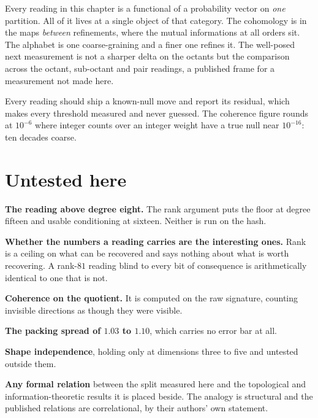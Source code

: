 Every reading in this chapter is a functional of a probability vector on \emph{one} partition. All of it lives at a single object of that category. The cohomology is in the maps \emph{between} refinements, where the mutual informations at all orders sit. The alphabet is one coarse-graining and a finer one refines it. The well-posed next measurement is not a sharper delta on the octants but the comparison across the octant, sub-octant and pair readings, a published frame for a measurement not made here.

Every reading should ship a known-null move and report its residual, which makes every threshold measured and never guessed. The coherence figure rounds at \(10^{-6}\) where integer counts over an integer weight have a true null near \(10^{-16}\): ten decades coarse.

\section{Untested here}

\textbf{The reading above degree eight.} The rank argument puts the floor at degree fifteen and usable conditioning at sixteen. Neither is run on the hash.

\textbf{Whether the numbers a reading carries are the interesting ones.} Rank is a ceiling on what can be recovered and says nothing about what is worth recovering. A rank-\(81\) reading blind to every bit of consequence is arithmetically identical to one that is not.

\textbf{Coherence on the quotient.} It is computed on the raw signature, counting invisible directions as though they were visible.

\textbf{The packing spread of \(1.03\) to \(1.10\)}, which carries no error bar at all.

\textbf{Shape independence}, holding only at dimensions three to five and untested outside them.

\textbf{Any formal relation} between the split measured here and the topological and information-theoretic results it is placed beside. The analogy is structural and the published relations are correlational, by their authors' own statement.
